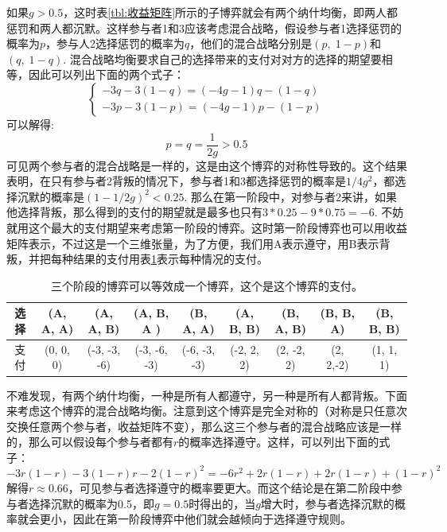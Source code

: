 \documentclass[lang=cn,11pt]{elegantpaper}
\begin{document}
如果$g>0.5$，这时表\ref{tbl:收益矩阵}所示的子博弈就会有两个纳什均衡，即两人都惩罚和两人都沉默。这样参与者1和3应该考虑混合战略，假设参与者1选择惩罚的概率为$p$，参与人2选择惩罚的概率为$q$，他们的混合战略分别是$(p,\;1-p)$和$(q,\;1-q)$. 混合战略均衡要求自己的选择带来的支付对对方的选择的期望要相等，因此可以列出下面的两个式子：
\begin{equation}
\left\{
\begin{split}
-3q-3(1-q)=(-4g-1)q-(1-q)\\
-3p-3(1-p)=(-4g-1)p-(1-p)
\end{split}
\right.
\end{equation}
可以解得:
\begin{equation}
p=q=\frac{1}{2g}>0.5
\end{equation}
可见两个参与者的混合战略是一样的，这是由这个博弈的对称性导致的。这个结果表明，在只有参与者2背叛的情况下，参与者1和3都选择惩罚的概率是$1/4g^2$，都选择沉默的概率是$(1-1/2g)^2<0.25$. 那么在第一阶段中，对参与者2来讲，如果他选择背叛，那么得到的支付的期望就是最多也只有$3*0.25-9*0.75=-6$. 不妨就用这个最大的支付期望来考虑第一阶段的博弈。这时第一阶段博弈也可以用收益矩阵表示，不过这是一个三维张量，为了方便，我们用A表示遵守，用B表示背叛，并把每种结果的支付用表\ref{tbl:收益矩阵2}表示每种情况的支付。
\begin{table}[htb] 
	\centering 
	\begin{tabular}{c|cccccccc} 
		选择 & (A, A, A)  &(A, A, B)& (A, B, A )& (B, A, A) & (A, B, B)  & (B, A, B)  & (B, B, A)  & (B, B, B)  \\
		\hline
		支付 &   (0, 0, 0)  &(-3, -3, -6)  & (-3, -6, -3)  &   (-6, -3, -3)  &   (-2, 2, 2)  &  (2, -2, 2)  &  (2, 2,-2)  &   (1, 1, 1) \\
	\end{tabular} 
	\caption{三个阶段的博弈可以等效成一个博弈，这个是这个博弈的支付。\label{tbl:收益矩阵2}} 
\end{table}

不难发现，有两个纳什均衡，一种是所有人都遵守，另一种是所有人都背叛。下面来考虑这个博弈的混合战略均衡。注意到这个博弈是完全对称的（对称是只任意次交换任意两个参与者，收益矩阵不变），那么这三个参与者的混合战略应该是一样的，那么可以假设每个参与者都有$r$的概率选择遵守。这样，可以列出下面的式子：
\begin{equation}
-3r(1-r)-3(1-r)r-2(1-r)^2=-6r^2+2r(1-r)+2r(1-r)+(1-r)^2
\end{equation}
解得$r\approx 0.66$，可见参与者选择遵守的概率要更大。而这个结论是在第二阶段中参与者选择沉默的概率为0.5，即$g=0.5$时得出的，当$g$增大时，参与者选择沉默的概率就会更小，因此在第一阶段博弈中他们就会越倾向于选择遵守规则。
\end{document}
